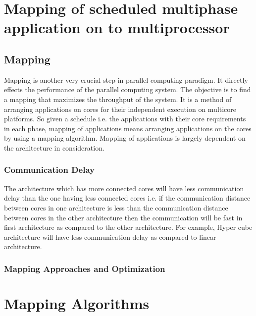 \documentclass[10pt, conference]{IEEEtran}
\begin{document}
\section{Mapping of scheduled multiphase application on to multiprocessor}
\subsection{Mapping}
Mapping is another very crucial step in parallel computing paradigm. It directly effects the performance of the parallel computing system.
The objective is to find a mapping that maximizes the throughput of the system. It is a method of arranging applications on cores for their independent execution on multicore platforms. So given a schedule i.e. the applications with their core requirements in each phase, mapping of applications means arranging applications on the cores by using a mapping algorithm. Mapping of applications is largely dependent on the architecture in consideration.

\subsubsection{Communication Delay}
The architecture which has more connected cores will have less communication delay than the one having less connected cores i.e. if the communication distance between cores in one architecture is less than the communication distance between cores in the other architecture then the communication will be fast in first architecture as compared to the other architecture.
For example, Hyper cube architecture will have less communication delay as compared to linear architecture.

\subsubsection{Mapping Approaches and Optimization}

\section{Mapping Algorithms}
\end{document}
